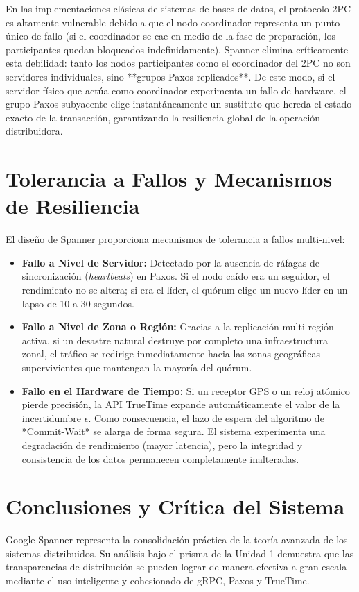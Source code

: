 \documentclass[11pt,a4paper]{article}
\begin{document}
En las implementaciones clásicas de sistemas de bases de datos, el protocolo 2PC es altamente vulnerable debido a que el nodo coordinador representa un punto único de fallo (si el coordinador se cae en medio de la fase de preparación, los participantes quedan bloqueados indefinidamente). Spanner elimina críticamente esta debilidad: tanto los nodos participantes como el coordinador del 2PC no son servidores individuales, sino **grupos Paxos replicados**. De este modo, si el servidor físico que actúa como coordinador experimenta un fallo de hardware, el grupo Paxos subyacente elige instantáneamente un sustituto que hereda el estado exacto de la transacción, garantizando la resiliencia global de la operación distribuidora.

\section{Tolerancia a Fallos y Mecanismos de Resiliencia}
El diseño de Spanner proporciona mecanismos de tolerancia a fallos multi-nivel:
\begin{itemize}
    \item \textbf{Fallo a Nivel de Servidor:} Detectado por la ausencia de ráfagas de sincronización (\textit{heartbeats}) en Paxos. Si el nodo caído era un seguidor, el rendimiento no se altera; si era el líder, el quórum elige un nuevo líder en un lapso de 10 a 30 segundos.
    \item \textbf{Fallo a Nivel de Zona o Región:} Gracias a la replicación multi-región activa, si un desastre natural destruye por completo una infraestructura zonal, el tráfico se redirige inmediatamente hacia las zonas geográficas supervivientes que mantengan la mayoría del quórum.
    \item \textbf{Fallo en el Hardware de Tiempo:} Si un receptor GPS o un reloj atómico pierde precisión, la API TrueTime expande automáticamente el valor de la incertidumbre $\epsilon$. Como consecuencia, el lazo de espera del algoritmo de *Commit-Wait* se alarga de forma segura. El sistema experimenta una degradación de rendimiento (mayor latencia), pero la integridad y consistencia de los datos permanecen completamente inalteradas.
\end{itemize}

\section{Conclusiones y Crítica del Sistema}
Google Spanner representa la consolidación práctica de la teoría avanzada de los sistemas distribuidos. Su análisis bajo el prisma de la Unidad 1 demuestra que las transparencias de distribución se pueden lograr de manera efectiva a gran escala mediante el uso inteligente y cohesionado de gRPC, Paxos y TrueTime.
\end{document}
